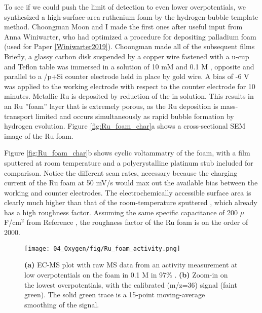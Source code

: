 To see if we could push the limit of  detection to even lower overpotentials, we synthesized a high-surface-area ruthenium foam by the hydrogen-bubble template method. Choongman Moon and I made the first ones after useful input from Anna Winiwarter, who had optimized a procedure for depositing palladium foam (used for Paper \ref{Winiwarter2019}). Choongman made all of the subsequent films Briefly, a glassy carbon disk suspended by a copper wire fastened with a u-cup and Teflon table was immersed in a solution of 10 mM  and 0.1 M , opposite and parallel to a /p+Si counter electrode held in place by gold wire. A bias of -6 V was applied to the working electrode with respect to the counter electrode for 10 minutes. Metallic Ru is deposited by reduction of the  in solution. This results in an Ru ''foam'' layer that is extremely porous, as the Ru deposition is mass-transport limited and occurs simultaneously as rapid bubble formation by hydrogen evolution. Figure \ref{fig:Ru_foam_char}a shows a cross-sectional SEM image of the Ru foam.

Figure \ref{fig:Ru_foam_char}b shows cyclic voltammatry of the  foam, with a  film sputtered at room temperature and a polycrystalline platinum stub included for comparison. Notice the different scan rates, necessary because the charging current of the Ru foam at 50 mV/s would max out the available bias between the working and counter electrodes. The electrochemically accessible surface area is clearly much higher than that of the room-temperature sputtered , which already has a high roughness factor. Assuming the same specific capacitance of 200 $\mu$F/cm$^{2}$ from Reference \cite{Yoshida2013}, the roughness factor of the Ru foam is on the order of 2000.

\begin{figure}[h!]
	\centering
	\texttt{[image: 04\_Oxygen/fig/Ru\_foam\_activity.png]}
	\caption{\textbf{(a)} EC-MS plot with raw MS data from an activity measurement at low overpotentials on the  foam in 0.1 M  in 97\% . \textbf{(b)} Zoom-in on the lowest overpotentials, with the calibrated  (m/z=36) signal (faint green). The solid green trace is a 15-point moving-average smoothing of the  signal.}
	\label{fig:Ru_foam_activity}
\end{figure}

